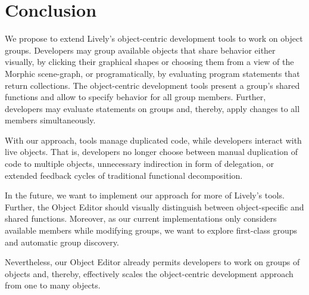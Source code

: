 \section{Conclusion} \label{sec:CONCLUSION}

We propose to extend Lively's object-centric development tools to work
on object groups. Developers may group available objects that share
behavior either visually, by clicking their graphical shapes
or choosing them from a view of the Morphic scene-graph, or
programatically, by evaluating program statements that return
collections. The object-centric development tools present a group's
shared functions and allow to specify behavior for all
group members. Further, developers may evaluate
statements on groups and, thereby, apply changes to all members simultaneously.

With our approach, tools manage duplicated code, while
developers interact with live objects. That is,
developers no longer choose between manual duplication of code to
multiple objects, unnecessary indirection in form of delegation, or
extended feedback cycles of traditional functional decomposition.

In the future, we want to implement our approach for more of Lively's tools. Further, the Object Editor should visually distinguish between
object-specific and shared functions. Moreover, as our current
implementations only considers available members while modifying
groups, we want to explore first-class groups and automatic group
discovery.

Nevertheless, our Object Editor already permits
developers to work on groups of objects and, thereby, effectively
scales the object-centric development approach from one to many
objects.

